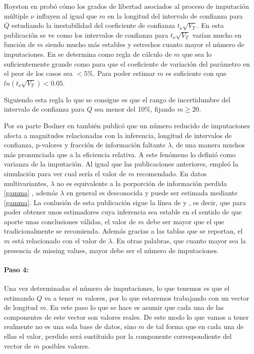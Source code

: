 \documentclass[a4paper,openright,12pt]{report}
\begin{document}
Royston en \cite{Royston2004} probó cómo los grados de libertad asociados al proceso de imputación múltiple $\nu$ influyen al igual que $m$ en la longitud del intervalo de confianza para $\overline{Q}$ estudiando la inestabilidad del coeficiente de confianza $t_{\nu}\sqrt{V_{T}}$. En esta publicación se ve como los intervalos de confianza para $t_{\nu}\sqrt{V_{T}}$ varían mucho en función de $m$ siendo mucho más estables y estrechos cuanto mayor el número de imputaciones. En \cite{Royston2004} se determina como regla de cálculo de $m$ que sea lo suficientemente grande como para que el coeficiente de variación del parámetro en el peor de los casos sea $<5\%$. Para poder estimar $m$ es suficiente con que $ln(t_{\nu}\sqrt{V_{T}})<0.05$.

Siguiendo esta regla lo que se consigue es que el rango de incertidumbre del intervalo de confianza para $Q$ sea menor del 10\%, fijando $m \geq 20$.

Por su parte Bodner en \cite{Bodner2008} también publicó que un número reducido de imputaciones afecta a magnitudes relacionadas con la inferencia, longitud de intervalos de confianza, p-valores y fracción de información faltante $\lambda$, de una manera muchos más pronunciada que a la eficiencia relativa. A este fenómeno lo definió como varianza de la imputación. Al igual que las publicaciones anteriores, empleó la simulación para ver cual sería el valor de $m$ recomendado. En datos multivariantes, $\lambda$ no es equivalente a la porporción de información perdida \ref{gamma} \cite{Longford2005}, además $\lambda$ en general es desconocida y puede ser estimada mediante \ref{gamma}. La conlusión de esta publicación sigue la línea de \cite{Graham2007} y \cite{Royston2004}, es decir, que para poder obtener unos estimadores cuya inferencia sea estable en el sentido de que aporte unas conclusiones válidas, el  valor de $m$ debe ser mayor que el que tradicionalmente se recomienda. Además gracias a las tablas que se reportan, el $m$ está relacionado con el valor de $\lambda$. En otras palabras, que cuanto mayor sea la presencia de missing values, mayor debe ser el número de imputaciones.

\paragraph{Paso 4:}
Una vez determinadas el número de imputaciones, lo que tenemos es que el estimando $Q$ va a tener $m$ valores, por lo que estaremos trabajando con un vector de longitud $m$. En este paso lo que se hace es asumir que cada una de las componentes de este vector son valores reales. De este modo lo que vamos a tener realmente no es una sola base de datos, sino $m$ de tal forma que en cada una de ellas el valor, perdido será sustituido por la componente correspondiente del vector de $m$ posibles valores.
\end{document}
